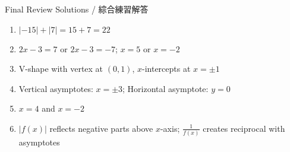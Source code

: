 \documentclass[aspectratio=169]{beamer}
\begin{document}
\begin{frame}{Final Review Solutions / 綜合練習解答}
    \begin{tcolorbox}[colback=lightgray,colframe=accent,title=Solutions]
        \footnotesize
        \begin{enumerate}
            \item $|-15| + |7| = 15 + 7 = 22$
            \item $2x-3 = 7$ or $2x-3 = -7$; $x = 5$ or $x = -2$
            \item V-shape with vertex at $(0,1)$, $x$-intercepts at $x = \pm 1$
            \item Vertical asymptotes: $x = \pm 3$; Horizontal asymptote: $y = 0$
            \item $x = 4$ and $x = -2$
            \item $|f(x)|$ reflects negative parts above $x$-axis; $\frac{1}{f(x)}$ creates reciprocal with asymptotes
        \end{enumerate}
    \end{tcolorbox}
\end{frame}
\end{document}
